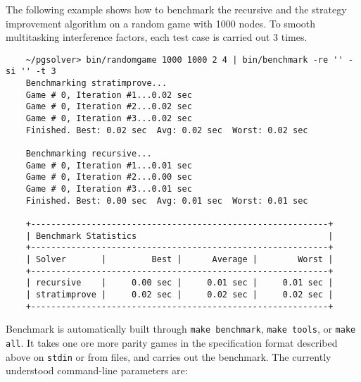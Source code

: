 \begin{example}
The following example shows how to benchmark the recursive and the strategy improvement algorithm on a 
random game with 1000 nodes. To smooth multitasking interference factors, each test case is carried out 
3 times.
\begin{verbatim}
    ~/pgsolver> bin/randomgame 1000 1000 2 4 | bin/benchmark -re '' -si '' -t 3
    Benchmarking stratimprove...
    Game # 0, Iteration #1...0.02 sec
    Game # 0, Iteration #2...0.02 sec
    Game # 0, Iteration #3...0.02 sec
    Finished. Best: 0.02 sec  Avg: 0.02 sec  Worst: 0.02 sec

    Benchmarking recursive...
    Game # 0, Iteration #1...0.01 sec
    Game # 0, Iteration #2...0.00 sec
    Game # 0, Iteration #3...0.01 sec
    Finished. Best: 0.00 sec  Avg: 0.01 sec  Worst: 0.01 sec

    +-----------------------------------------------------------+
    | Benchmark Statistics                                      |
    +-----------------------------------------------------------+
    | Solver       |         Best |      Average |        Worst |
    +-----------------------------------------------------------+
    | recursive    |     0.00 sec |     0.01 sec |     0.01 sec |
    | stratimprove |     0.02 sec |     0.02 sec |     0.02 sec |
    +-----------------------------------------------------------+
\end{verbatim}
\end{example}

Benchmark is automatically built through \verb#make benchmark#, \verb#make tools#, or \verb#make all#.
It takes one ore more parity games in the specification format described above on \texttt{stdin} or
from files, and carries out the benchmark. The currently understood command-line parameters are:

